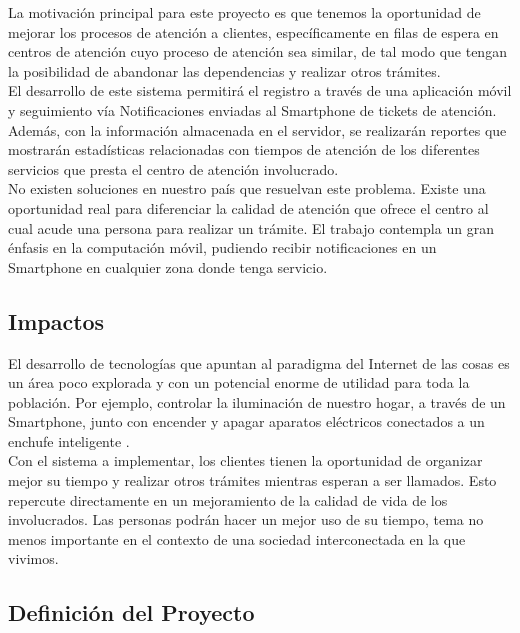 La motivación principal para este proyecto es que tenemos la oportunidad de mejorar los procesos de atención a clientes, específicamente en filas de espera en centros de atención cuyo proceso de atención sea similar, de tal modo que tengan la posibilidad de abandonar las dependencias  y realizar otros trámites.\\

El desarrollo de este sistema  permitirá el  registro a través de una aplicación móvil y seguimiento vía Notificaciones enviadas al Smartphone de tickets de atención. Además, con la información almacenada en el servidor, se realizarán reportes que mostrarán estadísticas relacionadas con tiempos de atención de los diferentes servicios que presta el centro de atención involucrado.\\

No existen soluciones en nuestro país que resuelvan este problema. Existe una oportunidad real para diferenciar la calidad de atención que ofrece el centro al cual acude una persona para realizar un trámite. El trabajo contempla un gran énfasis en la computación móvil, pudiendo recibir notificaciones en un Smartphone en cualquier zona donde tenga servicio.\\


\subsection{Impactos}

El desarrollo de tecnologías que apuntan al paradigma del Internet de las cosas es un área poco explorada y con un potencial enorme de utilidad para toda la población. Por ejemplo, controlar la iluminación de nuestro hogar, a través de un Smartphone, junto con encender y apagar aparatos eléctricos conectados a un enchufe inteligente \cite{Kit}. \\

Con el sistema a implementar, los clientes tienen la oportunidad de organizar mejor su tiempo y realizar otros trámites mientras esperan a ser llamados. Esto repercute directamente en un mejoramiento de la calidad de vida de los involucrados. Las personas podrán hacer un mejor uso de su tiempo, tema no menos importante en el contexto de una sociedad interconectada en  la que vivimos.\\


\subsection{Definición del Proyecto}

